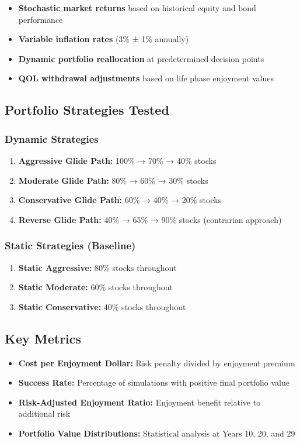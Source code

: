 \documentclass[11pt,letterpaper]{article}
\begin{document}
\begin{itemize}[leftmargin=*]
    \item \textbf{Stochastic market returns} based on historical equity and bond performance
    \item \textbf{Variable inflation rates} (3\% ± 1\% annually)
    \item \textbf{Dynamic portfolio reallocation} at predetermined decision points
    \item \textbf{QOL withdrawal adjustments} based on life phase enjoyment values
\end{itemize}

\subsection{Portfolio Strategies Tested}

\subsubsection{Dynamic Strategies}
\begin{enumerate}[leftmargin=*]
    \item \textbf{Aggressive Glide Path:} 100\% → 70\% → 40\% stocks
    \item \textbf{Moderate Glide Path:} 80\% → 60\% → 30\% stocks  
    \item \textbf{Conservative Glide Path:} 60\% → 40\% → 20\% stocks
    \item \textbf{Reverse Glide Path:} 40\% → 65\% → 90\% stocks (contrarian approach)
\end{enumerate}

\subsubsection{Static Strategies (Baseline)}
\begin{enumerate}[leftmargin=*]
    \item \textbf{Static Aggressive:} 80\% stocks throughout
    \item \textbf{Static Moderate:} 60\% stocks throughout
    \item \textbf{Static Conservative:} 40\% stocks throughout
\end{enumerate}

\subsection{Key Metrics}
\begin{itemize}[leftmargin=*]
    \item \textbf{Cost per Enjoyment Dollar:} Risk penalty divided by enjoyment premium
    \item \textbf{Success Rate:} Percentage of simulations with positive final portfolio value
    \item \textbf{Risk-Adjusted Enjoyment Ratio:} Enjoyment benefit relative to additional risk
    \item \textbf{Portfolio Value Distributions:} Statistical analysis at Years 10, 20, and 29
\end{itemize}
\end{document}
